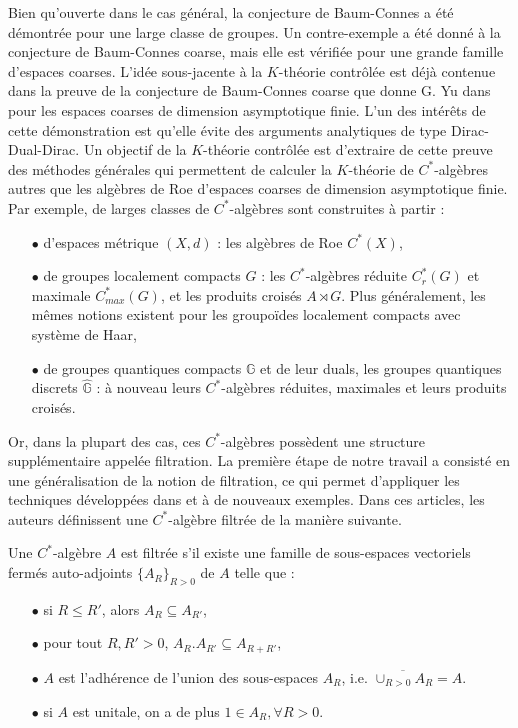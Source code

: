 Bien qu'ouverte dans le cas général, la conjecture de Baum-Connes a été démontrée pour une large classe de groupes. Un contre-exemple a été donné à la conjecture de Baum-Connes coarse, mais elle est vérifiée pour une grande famille d'espaces coarses. L'idée sous-jacente à la $K$-théorie contrôlée est déjà contenue dans la preuve de la conjecture de Baum-Connes coarse que donne G. Yu dans \cite{Yu1} pour les espaces coarses de dimension asymptotique finie. L'un des intérêts de cette démonstration est qu'elle évite des arguments analytiques de type Dirac-Dual-Dirac. Un objectif de la $K$-théorie contrôlée est d'extraire de cette preuve des méthodes générales qui permettent de calculer la $K$-théorie de $C^*$-algèbres autres que les algèbres de Roe d'espaces coarses de dimension asymptotique finie.\\

Par exemple, de larges classes de $C^*$-algèbres sont construites à partir :
\begin{itemize}
\item[$\bullet$] d'espaces métrique $(X,d)$ : les algèbres de Roe $C^*(X)$,
\item[$\bullet$] de groupes localement compacts $G$ : les $C^*$-algèbres réduite $C^*_r(G)$ et maximale $C^*_{max}(G)$, et les produits croisés $A\rtimes G$. Plus généralement, les mêmes notions existent pour les groupoïdes localement compacts avec système de Haar,
\item[$\bullet$] de groupes quantiques compacts $\mathbb G$ et de leur duals, les groupes quantiques discrets $\hat{\mathbb G}$ : à nouveau leurs $C^*$-algèbres réduites, maximales et leurs produits croisés.\\
\end{itemize}

Or, dans la plupart des cas, ces $C^*$-algèbres possèdent une structure supplémentaire appelée filtration. La première étape de notre travail a consisté en une généralisation de la notion de filtration, ce qui permet d'appliquer les techniques développées dans \cite{OY2} et \cite{OY3} à de nouveaux exemples. Dans ces articles, les auteurs définissent une $C^*$-algèbre filtrée de la manière suivante.

\begin{definitionfr}
Une $C^*$-algèbre $A$ est filtrée s'il existe une famille de sous-espaces vectoriels fermés auto-adjoints $\{A_R\}_{R>0}$ de $A$ telle que :
\begin{itemize}
\item[$\bullet$] si $R\leq R'$, alors $A_R\subseteq A_{R'}$,
\item[$\bullet$] pour tout $R,R'>0$, $A_R.A_{R'}\subseteq A_{R+R'}$,
\item[$\bullet$] $A$ est l'adhérence de l'union des sous-espaces $A_R$, i.e. $\overline{\cup_{R>0}A_R} = A$.
\item[$\bullet$] si $A$ est unitale, on a de plus $1\in A_R,\forall R>0$.
\end{itemize}
\end{definitionfr}

